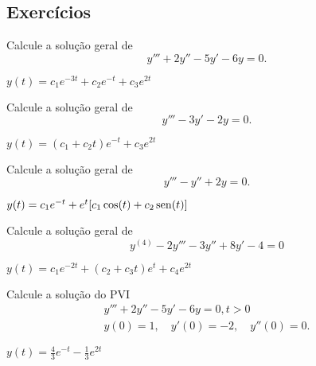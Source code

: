 \subsection*{Exercícios}

\begin{ex}
  Calcule a solução geral de
  \begin{equation}
    y''' + 2y'' - 5y' - 6y = 0.
  \end{equation}
\end{ex}
\begin{resp}
  $y(t) = c_1 e^{- 3 t} + c_{2} e^{- t} + c_{3} e^{2 t}$
\end{resp}

\begin{ex}
  Calcule a solução geral de
  \begin{equation}
    y''' - 3y'- 2y = 0.
  \end{equation}
\end{ex}
\begin{resp}
  $y(t) = (c_1 + c_2t)e^{-t} + c_3e^{2t}$
\end{resp}

\begin{ex}
  Calcule a solução geral de
  \begin{equation}
    y''' - y'' + 2y = 0.
  \end{equation}
\end{ex}
\begin{resp}
  $y(t) = c_1e^{-t} + e^{t}[c_1\cos(t) + c_2\operatorname{sen}(t)]$
\end{resp}

\begin{ex}
  Calcule a solução geral de
  \begin{equation}
    y^{(4)}-2y'''-3y''+8y'-4=0
  \end{equation}
\end{ex}
\begin{resp}
  $y(t) = c_1e^{-2t} + (c_2+c_3t)e^{t}+c_4e^{2t}$
\end{resp}

\begin{ex}
  Calcule a solução do PVI
  \begin{align}
    y''' + 2y'' - 5y' - 6y = 0, t>0\\
    y(0)=1,\quad y'(0)=-2,\quad y''(0)=0.
  \end{align}
\end{ex}
\begin{resp}
  $y(t) = \frac{4}{3}e^{-t} - \frac{1}{3}e^{2t}$
\end{resp}

